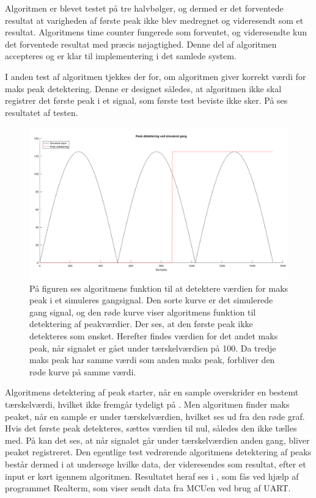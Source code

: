 Algoritmen er blevet testet på tre halvbølger, og dermed er det forventede resultat at varigheden af første peak ikke blev medregnet og videresendt som et resultat. Algoritmens time counter fungerede som forventet, og videresendte kun det forventede resultat med præcis nøjagtighed. Denne del af algoritmen accepteres og er klar til implementering i det samlede system.

I anden test af algoritmen tjekkes der for, om algoritmen giver korrekt værdi for maks peak detektering. Denne er designet således, at algoritmen ikke skal registrer det første peak i et signal, som første test beviste ikke sker. På  ses resultatet af testen.
\begin{figure}[H]
	\centering
	\includegraphics[scale=0.3]{figures/cDesign/test_peak_gang.png}
	\caption{På figuren ses algoritmens funktion til at detektere værdien for maks peak i et simuleres gangsignal. Den sorte kurve er det simulerede gang signal, og den røde kurve viser algoritmens funktion til detektering af peakværdier. Der ses, at den første peak ikke detekteres som ønsket. Herefter findes værdien for det andet maks peak, når signalet er gået under tærskelværdien på 100. Da tredje maks peak har samme værdi som anden maks peak, forbliver den røde kurve på samme værdi.}
	\label{fig:test_peak_gang}
\end{figure}
Algoritmens detektering af peak starter, når en sample overskrider en bestemt tærskelværdi, hvilket ikke fremgår tydeligt på . Men algoritmen finder maks peaket, når en sample er under tærskelværdien, hvilket ses ud fra den røde graf. Hvis det første peak detekteres, sættes værdien til nul, således den ikke tælles med. På  kan det ses, at når signalet går under tærskelværdien anden gang, bliver peaket registreret. Den egentlige test vedrørende algoritmens detektering af peaks består dermed i at undersøge hvilke data, der videresendes som resultat, efter et input er kørt igennem algoritmen. Resultatet heraf ses i , som fås ved hjælp af programmet Realterm, som viser sendt data fra MCUen ved brug af UART.
